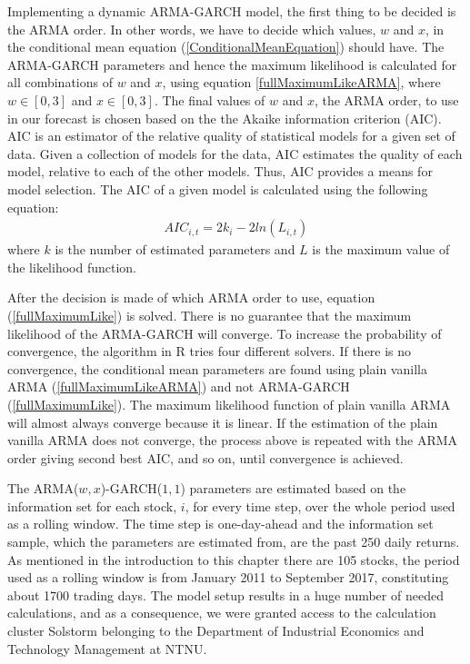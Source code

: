 Implementing a dynamic ARMA-GARCH model, the first thing to be decided is the ARMA order. In other words, we have to decide which values, $w$ and $x$, in the conditional mean equation (\ref{ConditionalMeanEquation}) should have. The ARMA-GARCH parameters and hence the maximum likelihood is calculated for all combinations of $w$ and $x$, using equation \ref{fullMaximumLikeARMA}, where $w\in[0,3]$ and $x\in[0,3]$. The final values of $w$ and $x$, the ARMA order, to use in our forecast is chosen based on the the Akaike information criterion (AIC). AIC is an estimator of the relative quality of statistical models for a given set of data. Given a collection of models for the data, AIC estimates the quality of each model, relative to each of the other models. Thus, AIC provides a means for model selection. The AIC of a given model is calculated using the following equation:
\begin{align}
    AIC_{i,t}=2k_i-2ln(L_{i,t})
\end{align}
where $k$ is the number of estimated parameters and $L$ is the maximum value of the likelihood function. 

After the decision is made of which ARMA order to use, equation (\ref{fullMaximumLike}) is solved. There is no guarantee that the maximum likelihood of the ARMA-GARCH will converge. To increase the probability of convergence, the algorithm in R tries four different solvers. If there is no convergence, the conditional mean parameters are found using plain vanilla ARMA (\ref{fullMaximumLikeARMA}) and not ARMA-GARCH (\ref{fullMaximumLike}). The maximum likelihood function of plain vanilla ARMA will almost always converge because it is linear. If the estimation of the plain vanilla ARMA does not converge, the process above is repeated with the ARMA order giving second best AIC, and so on, until convergence is achieved.

The ARMA($w,x$)-GARCH($1,1$) parameters are estimated based on the information set for each stock, $i$, for every time step, over the whole period used as a rolling window. The time step is one-day-ahead and the information set sample, which the parameters are estimated from, are the past 250 daily returns. As mentioned in the introduction to this chapter there are 105 stocks, the period used as a rolling window is from January 2011 to September 2017, constituting about 1700 trading days. The model setup results in a huge number of needed calculations, and as a consequence, we were granted access to the calculation cluster Solstorm belonging to the Department of Industrial Economics and Technology Management at NTNU. 

